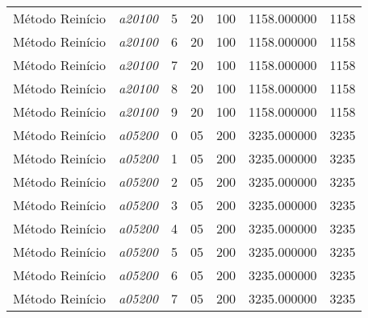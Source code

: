 {\begin{longtable}{cc|c|cc|cc}
			Método Reinício    & \textit{a20100}    & 5                               & 20               & 100              & 1158.000000                          & 1158 \\ 
			Método Reinício    & \textit{a20100}    & 6                               & 20               & 100              & 1158.000000                          & 1158 \\ 
			Método Reinício    & \textit{a20100}    & 7                               & 20               & 100              & 1158.000000                          & 1158 \\ 
			Método Reinício    & \textit{a20100}    & 8                               & 20               & 100              & 1158.000000                          & 1158 \\ 
			Método Reinício    & \textit{a20100}    & 9                               & 20               & 100              & 1158.000000                          & 1158 \\ \hline
			Método Reinício    & \textit{a05200}    & 0                               & 05               & 200              & 3235.000000                          & 3235 \\ 
			Método Reinício    & \textit{a05200}    & 1                               & 05               & 200              & 3235.000000                          & 3235 \\ 
			Método Reinício    & \textit{a05200}    & 2                               & 05               & 200              & 3235.000000                          & 3235 \\ 
			Método Reinício    & \textit{a05200}    & 3                               & 05               & 200              & 3235.000000                          & 3235 \\ 
			Método Reinício    & \textit{a05200}    & 4                               & 05               & 200              & 3235.000000                          & 3235 \\ 
			Método Reinício    & \textit{a05200}    & 5                               & 05               & 200              & 3235.000000                          & 3235 \\ 
			Método Reinício    & \textit{a05200}    & 6                               & 05               & 200              & 3235.000000                          & 3235 \\ 
			Método Reinício    & \textit{a05200}    & 7                               & 05               & 200              & 3235.000000                          & 3235 \\ 

\end{longtable}}
